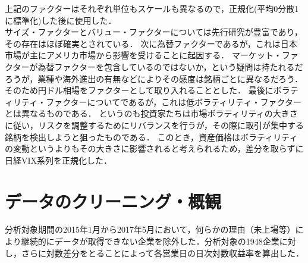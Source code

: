 ﻿\documentclass[11pt]{jreport}
\begin{document}
\begin{itemize}
\begin{itemize}
\end{itemize}
上記のファクターはそれぞれ単位もスケールも異なるので，正規化(平均0分散1に標準化)した後に使用した．\\
\quad 
サイズ・ファクターとバリュー・ファクターについては先行研究が豊富であり，その存在はほぼ確実とされている．
次に為替ファクターであるが，これは日本市場が主にアメリカ市場から影響を受けることに起因する．
マーケット・ファクターが為替ファクターを包含しているのではないか，という疑問は持たれるだろうが，業種や海外進出の有無などによりその感度は銘柄ごとに異なるだろう．
そのため円ドル相場をファクターとして取り入れることとした．
最後にボラティリティ・ファクターについてであるが，これは低ボラティリティ・ファクターとは異なるものである．
というのも投資家たちは市場ボラティリティの大きさに従い，リスクを調整するためにリバランスを行うが，その際に取引が集中する銘柄を検出しようと狙ったものである．
このとき，資産価格はボラティリティの変動というよりもその大きさに影響されると考えられるため，差分を取らずに日経VIX系列を正規化した．\\

\end{itemize}



\section{データのクリーニング・概観}
分析対象期間の2015年1月から2017年5月において，何らかの理由（未上場等）により継続的にデータが取得できない企業を除外した．分析対象の1948企業に対し，さらに対数差分をとることによって各営業日の日次対数収益率を算出した．
\end{document}
